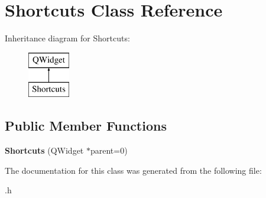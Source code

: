 \hypertarget{class_shortcuts}{}\section{Shortcuts Class Reference}
\label{class_shortcuts}
Inheritance diagram for Shortcuts\+:\begin{figure}[H]
\begin{center}
\leavevmode
\includegraphics[height=2.000000cm]{class_shortcuts}
\end{center}
\end{figure}
\subsection*{Public Member Functions}
\begin{DoxyCompactItemize}
\item 
\hypertarget{class_shortcuts_a6363f9a777b61bf385ce4a07613c8160}{}{\bfseries Shortcuts} (Q\+Widget $\ast$parent=0)\label{class_shortcuts_a6363f9a777b61bf385ce4a07613c8160}

\end{DoxyCompactItemize}


The documentation for this class was generated from the following file\+:\begin{DoxyCompactItemize}
\item 
.\+h\end{DoxyCompactItemize}

